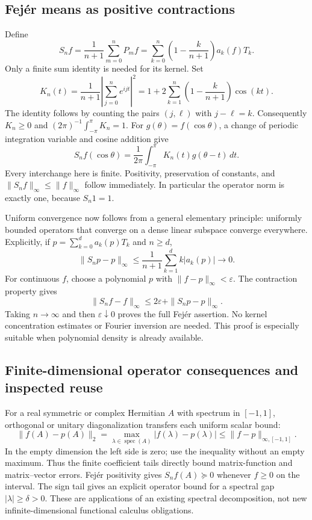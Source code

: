 \documentclass[11pt]{article}
\theoremstyle{remark}
\numberwithin{equation}{section}
\begin{document}
\subsection{Fej\'er means as positive contractions}
\label{polyseries:fejer}
Define
\[
 S_nf=\frac1{n+1}\sum_{m=0}^nP_mf
 =\sum_{k=0}^n\left(1-\frac{k}{n+1}\right)a_k(f)T_k.
\]
Only a finite sum identity is needed for its kernel. Set
\begin{equation}\label{polyseries:fejerkernel}
 K_n(t)=\frac1{n+1}\left|\sum_{j=0}^ne^{ijt}\right|^2
 =1+2\sum_{k=1}^n\left(1-\frac{k}{n+1}\right)\cos(kt).
\end{equation}
The identity follows by counting the pairs $(j,\ell)$ with $j-\ell=k$.
Consequently $K_n\ge0$ and $(2\pi)^{-1}\int_{-\pi}^\pi K_n=1$.
For $g(\theta)=f(\cos\theta)$, a change of periodic integration variable
and cosine addition give
\begin{equation}\label{polyseries:fejeroperator}
 S_nf(\cos\theta)=\frac1{2\pi}\int_{-\pi}^\pi
                K_n(t)g(\theta-t)\,dt.
\end{equation}
Every interchange here is finite. Positivity, preservation of constants,
and $\|S_nf\|_\infty\le\|f\|_\infty$ follow immediately. In particular
the operator norm is exactly one, because $S_n1=1$.

Uniform convergence now follows from a general elementary principle:
uniformly bounded operators that converge on a dense linear subspace
converge everywhere. Explicitly, if $p=\sum_{k=0}^da_k(p)T_k$ and $n\ge d$,
\[
 \|S_np-p\|_\infty
 \le\frac1{n+1}\sum_{k=1}^d k|a_k(p)|\longrightarrow0.
\]
For continuous $f$, choose a polynomial $p$ with
$\|f-p\|_\infty<\varepsilon$. The contraction property gives
\[
 \|S_nf-f\|_\infty
 \le2\varepsilon+\|S_np-p\|_\infty.
\]
Taking $n\to\infty$ and then $\varepsilon\downarrow0$ proves the full
Fej\'er assertion. No kernel concentration estimates or Fourier inversion
are needed. This proof is especially suitable when polynomial density is
already available.

\subsection{Finite-dimensional operator consequences and inspected reuse}
\label{polyseries:reuse}
For a real symmetric or complex Hermitian $A$ with spectrum in $[-1,1]$,
orthogonal or unitary diagonalization transfers each uniform scalar bound:
\[
 \|f(A)-p(A)\|_2=\max_{\lambda\in\operatorname{spec}(A)}
                       |f(\lambda)-p(\lambda)|
 \le\|f-p\|_{\infty,[-1,1]}.
\]
In the empty dimension the left side is zero; use the inequality without
an empty maximum. Thus the finite coefficient tails directly bound
matrix-function and matrix--vector errors. Fej\'er positivity gives
$S_nf(A)\succeq0$ whenever $f\ge0$ on the interval. The sign tail gives
an explicit operator bound for a spectral gap $|\lambda|\ge\delta>0$.
These are applications of an existing spectral decomposition, not new
infinite-dimensional functional calculus obligations.
\end{document}

